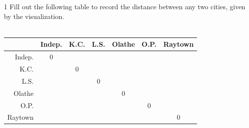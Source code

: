\documentclass[a4paper,12pt]{book}
\newcounter{question}
\begin{document}
\newpage




\begin{question}{\thequestion}{1}
    Fill out the following table to record the distance between any two cities,
    given by the visualization.
    ~\\~\\
    \Large 
    \begin{tabular}{r | c | c | c | c | c | c}
                & Indep.    & K.C.      & L.S.  & Olathe    & O.P.      & Raytown
        \\ \hline
        Indep.  & 0         &          &     &         &         & 
        \\ \hline
        K.C.    &          & 0         &     &         &         & 
        \\ \hline
        L.S.    &         &         & 0     &         &        & 
        \\ \hline
        Olathe  &         &         &     & 0         &         & 
        \\ \hline
        O.P.    &         &         &     &        & 0         & 
        \\ \hline
        Raytown &          &          &      &         &         & 0
    \end{tabular}
~\\
\end{question}
\end{document}
